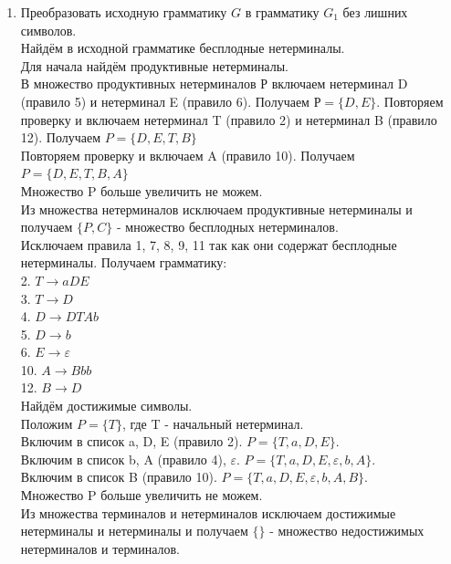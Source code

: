 \documentclass[a4paper,14pt]{extarticle}
\begin{document}
\begin{enumerate}[1.]
    \item Преобразовать исходную грамматику $G$ в
    грамматику $G_1$ без лишних символов.\\
    Найдём в исходной грамматике бесплодные нетерминалы.\\
    Для начала найдём продуктивные нетерминалы.\\
    В множество продуктивных нетерминалов Р включаем нетерминал D
(правило 5) и нетерминал E (правило 6). Получаем $Р=\{D,E\}$.
Повторяем проверку и включаем нетерминал T (правило 2) и нетерминал B (правило 12). 
Получаем $P=\{D,E,T,B\}$\\
Повторяем проверку и включаем A (правило 10). Получаем $P=\{D,E,T,B,A\}$\\
Множество P больше увеличить не можем.\\

Из множества нетерминалов исключаем продуктивные 
нетерминалы и получаем $\{P,C\}$ - множество бесплодных нетерминалов.\\

Исключаем правила 1, 7, 8, 9, 11 так как они содержат 
бесплодные нетерминалы. Получаем грамматику:\\

2. $T \rightarrow aDE$\\
3. $T \rightarrow D$\\
4. $D \rightarrow DTAb$\\
5. $D \rightarrow b$\\
6. $E \rightarrow \varepsilon$\\
10. $A \rightarrow Bbb$\\
12. $B \rightarrow D$\\

Найдём достижимые символы.\\
Положим $P = \{T\}$, где T - начальный нетерминал.\\
Включим в список a, D, E (правило 2). $P = \{T, a, D, E\}$.\\
Включим в список b, A (правило 4), $\varepsilon$. $P = \{T, a, D, E, \varepsilon, b, A\}$.\\
Включим в список B (правило 10). $P = \{T, a, D, E, \varepsilon, b, A, B\}$.\\
Множество P больше увеличить не можем.\\

Из множества терминалов и нетерминалов исключаем достижимые 
нетерминалы и нетерминалы и получаем $\{\}$ - множество недостижимых нетерминалов и терминалов.\\


\end{enumerate}
\end{document}
